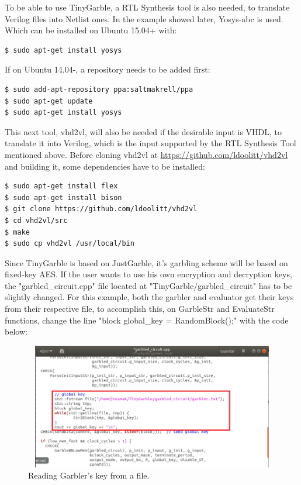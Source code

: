 \begin{refsection}
To be able to use TinyGarble, a RTL Synthesis tool is also needed, to translate Verilog files into Netlist ones. In the example showed later, Yosys-abc is used. Which can be installed on Ubuntu 15.04+ with:

\begin{lstlisting}[caption={Installation of Yosys-abc for Ubuntu 15.04>}, language=bash, captionpos=b]
$ sudo apt-get install yosys
\end{lstlisting}

If on Ubuntu 14.04-, a repository needs to be added first:

\begin{lstlisting}[caption={Installation of Yosys-abc for Ubuntu 14.04<}, language=bash, captionpos=b]
$ sudo add-apt-repository ppa:saltmakrell/ppa
$ sudo apt-get update
$ sudo apt-get install yosys
\end{lstlisting}

This next tool, vhd2vl, will also be needed if the desirable input is VHDL, to translate it into Verilog, which is the input supported by the RTL Synthesis Tool mentioned above.
Before cloning vhd2vl at \url{https://github.com/ldoolitt/vhd2vl} and building it, some dependencies have to be installed:

\begin{lstlisting}[caption={Installation of VHD2VL}, language=bash, captionpos=b]
$ sudo apt-get install flex
$ sudo apt-get install bison
$ git clone https://github.com/ldoolitt/vhd2vl
$ cd vhd2vl/src
$ make
$ sudo cp vhd2vl /usr/local/bin
\end{lstlisting}

Since TinyGarble is based on JustGarble, it's garbling scheme will be based on fixed-key AES. If the user wants to use his own encryption and decryption keys, the "garbled\_circuit.cpp" file located at "TinyGarble/garbled\_circuit" has to be slightly changed. For this example, both the garbler and evaluator get their keys from their respective file, to accomplish this, on GarbleStr and EvaluateStr functions, change the line "block global\_key =  RandomBlock();" with the code below:

\begin{figure}[H]
	\centering
	\includegraphics[width=1\textwidth, height=5.5cm]{./sdf/secure_multiparty_computation/figures/key_file.png}
    \caption{Reading Garbler's key from a file.}\label{fig:key_file}
\end{figure}


\end{refsection}
